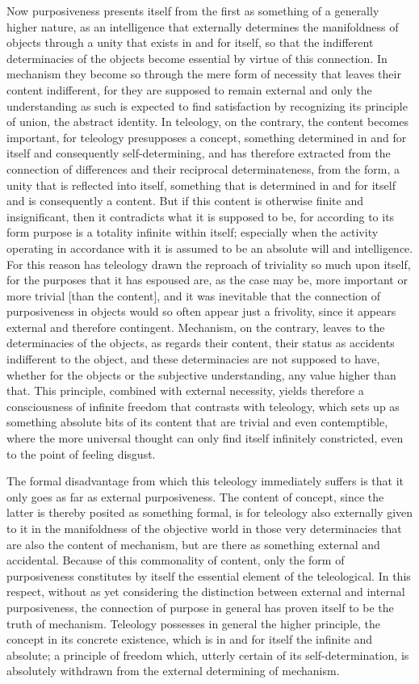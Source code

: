 Now purposiveness presents itself from the first
as something of a generally higher nature,
as an intelligence that externally determines
the manifoldness of objects through a unity
that exists in and for itself,
so that the indifferent determinacies of the objects
become essential by virtue of this connection.
In mechanism they become so through the mere form of necessity
that leaves their content indifferent,
for they are supposed to remain external
and only the understanding as such is
expected to find satisfaction by recognizing
its principle of union, the abstract identity.
In teleology, on the contrary, the content becomes important,
for teleology presupposes a concept,
something determined in and for itself
and consequently self-determining,
and has therefore extracted from the connection of
differences and their reciprocal determinateness, from the form,
a unity that is reflected into itself,
something that is determined in and for itself
and is consequently a content.
But if this content is otherwise finite and insignificant,
then it contradicts what it is supposed to be,
for according to its form purpose is
a totality infinite within itself;
especially when the activity operating in accordance
with it is assumed to be an absolute will and intelligence.
For this reason has teleology drawn the
reproach of triviality so much upon itself,
for the purposes that it has espoused are,
as the case may be, more important or more trivial [than the content],
and it was inevitable that the connection of purposiveness
in objects would so often appear just a frivolity,
since it appears external and therefore contingent.
Mechanism, on the contrary, leaves to the determinacies of the objects,
as regards their content, their status as accidents indifferent to the object,
and these determinacies are not supposed to have,
whether for the objects or the subjective understanding,
any value higher than that.
This principle, combined with external necessity,
yields therefore a consciousness of infinite freedom
that contrasts with teleology,
which sets up as something absolute bits of its content
that are trivial and even contemptible,
where the more universal thought can only
find itself infinitely constricted,
even to the point of feeling disgust.

The formal disadvantage from which
this teleology immediately suffers
is that it only goes as far as external purposiveness.
The content of concept, since the latter is
thereby posited as something formal,
is for teleology also externally given to it
in the manifoldness of the objective world
in those very determinacies that
are also the content of mechanism,
but are there as something external and accidental.
Because of this commonality of content,
only the form of purposiveness constitutes by itself
the essential element of the teleological.
In this respect, without as yet considering
the distinction between external and internal purposiveness,
the connection of purpose in general has
proven itself to be the truth of mechanism.
Teleology possesses in general the higher principle,
the concept in its concrete existence,
which is in and for itself the infinite and absolute;
a principle of freedom which, utterly certain of its self-determination,
is absolutely withdrawn from the external determining of mechanism.

